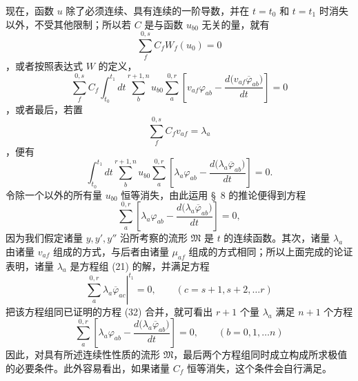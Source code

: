 \documentclass[11pt,a4paper,leqno]{article}
\begin{document}
现在，函数 $u$ 除了必须连续、具有连续的一阶导数，并在 $t=t_0$ 和 $t=t_1$ 时消失以外，不受其他限制；所以若 $C$ 是与函数 $u_{b0}$ 无关的量，就有
\[
\sum_f^{0,s}C_fW_f(u_0)=0
\]
，或者按照表达式 $W$ 的定义，
\[
\sum_f^{0,s}C_f
\int_{t_0}^{t_1}dt\sum_b^{r+1,n}u_{b0}\sum_a^{0,r}
\left[
v_{af}\varphi_{ab}-\frac{d\bigl(v_{af}\overline{\varphi}_{ab}\bigr)}{dt}
\right]=0
\]
，或者最后，若置
\[
\sum_f^{0,s}C_fv_{af}=\lambda_a
\]
，便有
\[
\int_{t_0}^{t_1}dt\sum_b^{r+1,n}u_{b0}\sum_a^{0,r}
\left[
\lambda_a\varphi_{ab}-\frac{d\bigl(\lambda_a\overline{\varphi}_{ab}\bigr)}{dt}
\right]=0.
\]
令除一个以外的所有量 $u_{b0}$ 恒等消失，由此运用 \S~8 的推论便得到方程
\begin{equation}\tag{32}
\sum_a^{0,r}
\left[
\lambda_a\varphi_{ab}-\frac{d\bigl(\lambda_a\overline{\varphi}_{ab}\bigr)}{dt}
\right]=0,
\end{equation}
因为我们假定诸量 $y,y',y''$ 沿所考察的流形 $\mathfrak M$ 是 $t$ 的连续函数。其次，诸量 $\lambda_a$ 由诸量 $v_{af}$ 组成的方式，与后者由诸量 $\mu_{af}$ 组成的方式相同；所以上面完成的论证表明，诸量 $\lambda_a$ 是方程组 (21) 的解，并满足方程
\begin{equation}\tag{33}
\left.\sum_a^{0,r}\lambda_a\overline{\varphi}_{ac}\right|^{t_1}=0,
\qquad(c=s+1,s+2,\ldots r)
\end{equation}
\newpage
把该方程组同已证明的方程 (32) 合并，就可看出 $r+1$ 个量 $\lambda_a$ 满足 $n+1$ 个方程
\begin{equation}\tag{34}
\sum_a^{0,r}
\left[
\lambda_a\varphi_{ab}-\frac{d\bigl(\lambda_a\overline{\varphi}_{ab}\bigr)}{dt}
\right]=0,
\qquad(b=0,1,\ldots n)
\end{equation}
因此，对具有所述连续性性质的流形 $\mathfrak M$，最后两个方程组同时成立构成所求极值的必要条件。此外容易看出，如果诸量 $C_f$ 恒等消失，这个条件会自行满足。
\end{document}

